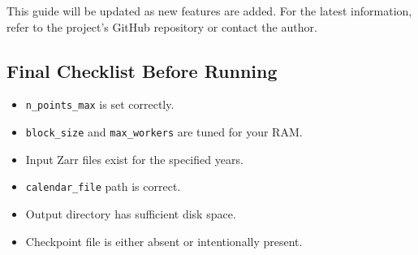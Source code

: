 \documentclass[12pt,a4paper]{article}
\begin{document}
This guide will be updated as new features are added. For the latest information, refer to the project's GitHub repository or contact the author.

\subsection*{Final Checklist Before Running}
\begin{itemize}
    \item \texttt{n\_points\_max} is set correctly.
    \item \texttt{block\_size} and \texttt{max\_workers} are tuned for your RAM.
    \item Input Zarr files exist for the specified years.
    \item \texttt{calendar\_file} path is correct.
    \item Output directory has sufficient disk space.
    \item Checkpoint file is either absent or intentionally present.
\end{itemize}
\end{document}
